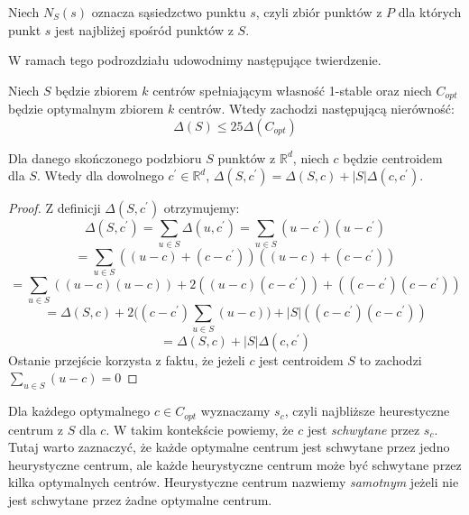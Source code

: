 \begin{definition}
    Niech $N_{S}(s)$ oznacza sąsiedzctwo punktu $s$, czyli zbiór punktów z $P$ dla których punkt $s$ jest najbliżej spośród punktów z $S$.
\end{definition}

W ramach tego podrozdziału udowodnimy następujące twierdzenie.

\begin{thm}
    Niech $S$ będzie zbiorem $k$ centrów spełniającym własność 1-stable oraz niech $C_{opt}$ będzie optymalnym zbiorem $k$ centrów.
    Wtedy zachodzi następującą nierówność:
    \begin{equation}
        \Delta(S) \leq 25 \Delta(C_{opt})
    \end{equation} 
\end{thm}

\begin{lemma}
    Dla danego skończonego podzbioru $S$ punktów z $\mathbb{R}^d$, niech $c$ będzie centroidem dla $S$. Wtedy dla dowolnego $c^{'} \in \mathbb{R}^d$, $\Delta(S, c^{'}) = \Delta(S, c) + |S|\Delta(c, c^{'})$.
\end{lemma}
\begin{proof}
    Z definicji $\Delta(S, c^{'})$ otrzymujemy:
    \begin{equation}
        \Delta(S, c^{'}) = \sum_{u \in S} \Delta(u, c^{'}) =  \sum_{u \in S} (u - c^{'}) (u - c^{'})
    \end{equation}
    \begin{equation}
         = \sum_{u \in S} ((u - c) + (c - c^{'})) ((u - c) + (c - c^{'}))
    \end{equation}
    \begin{equation}
        = \sum_{u \in S} ((u - c)(u - c)) + 2((u - c)(c - c^{'})) + ((c - c^{'})(c - c^{'}))
    \end{equation}
    \begin{equation}
        = \Delta(S, c) + 2\Big( (c - c^{'}) \sum_{u \in S} (u - c) \Big) + |S|((c - c^{'})(c - c^{'}))
    \end{equation}
    \begin{equation}
        = \Delta(S, c) + |S|\Delta(c,c^{'})
    \end{equation}
    Ostanie przejście korzysta z faktu, że jeżeli $c$ jest centroidem $S$ to zachodzi $\sum_{u \in S} (u - c) = 0$
\end{proof}

\noindent
Dla każdego optymalnego $c \in C_{opt}$ wyznaczamy $s_{c}$, czyli najbliższe heurestyczne centrum z $S$ dla $c$.
W takim kontekście powiemy, że $c$ jest \textit{schwytane} przez $s_{c}$.
Tutaj warto zaznaczyć, że każde optymalne centrum jest schwytane przez jedno heurystyczne centrum, ale każde heurystyczne centrum może być schwytane przez kilka optymalnych centrów.
Heurystyczne centrum nazwiemy \textit{samotnym} jeżeli nie jest schwytane przez żadne optymalne centrum.

